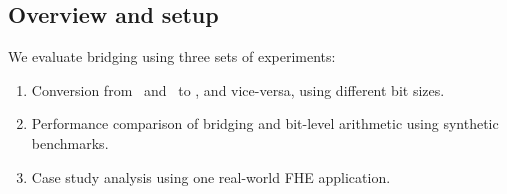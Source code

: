 \subsection{Overview and setup}\label{ss:setup}

We evaluate bridging using three sets of experiments:
\begin{enumerate}
    \item Conversion from \secuint\ and \secint\ to \secmod, and vice-versa, using different bit sizes.
    \item Performance comparison of bridging and bit-level arithmetic using synthetic benchmarks.
    \item Case study analysis using one real-world FHE application.
\end{enumerate}


